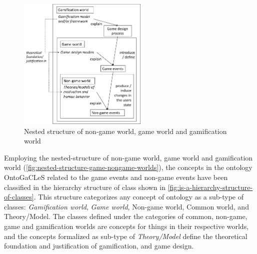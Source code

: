 \begin{figure}[!htb]
 \caption{Nested structure of non-game world, game world and gamification world}
 \label{fig:nested-structure-game-nongame-worlds}
 \centering
 \includegraphics[width=0.55\textwidth]{images/chap-ontogacles2/nested-structure-game-nongame-worlds.png}
 \fautor
\end{figure}

Employing the nested-structure of non-game world, game world and gamification world (\autoref{fig:nested-structure-game-nongame-worlds}), the concepts in the ontology OntoGaCLeS related to the game events and non-game events have been classified in the  hierarchy structure of class shown in \autoref{fig:is-a-hierarchy-structure-of-classes}. This structure categorizes any concept of ontology as a sub-type of classes: \emph{Gamification world}, \emph{Game world}, Non-game world, Common world, and Theory/Model. The classes defined under the categories of common, non-game, game and gamification worlds are concepts for things in their respective worlds, and the concepts formalized as sub-type of \emph{Theory/Model} define the theoretical foundation and justification of gamification, and game design.

